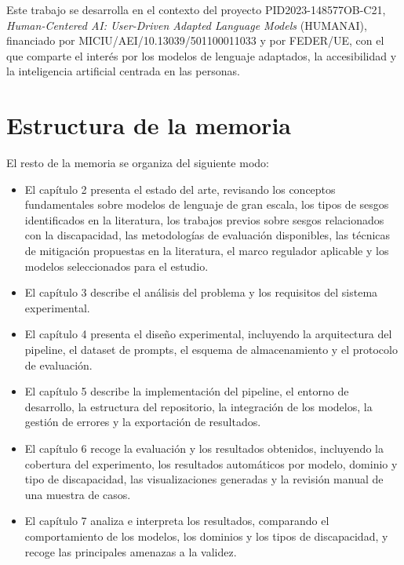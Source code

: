 \documentclass[12pt]{report} %
\renewcommand{\_}{\oldunderscore\allowbreak}
\begin{document}
Este trabajo se desarrolla en el contexto del proyecto PID2023-148577OB-C21, \textit{Human-Centered AI: User-Driven Adapted Language Models} (HUMAN\_AI), financiado por MICIU/AEI/10.13039/501100011033 y por FEDER/UE, con el que comparte el interés por los modelos de lenguaje adaptados, la accesibilidad y la inteligencia artificial centrada en las personas.

\section{Estructura de la memoria}

El resto de la memoria se organiza del siguiente modo:

\begin{itemize}
    \item El capítulo 2 presenta el estado del arte, revisando los conceptos fundamentales sobre modelos de lenguaje de gran escala, los tipos de sesgos identificados en la literatura, los trabajos previos sobre sesgos relacionados con la discapacidad, las metodologías de evaluación disponibles, las técnicas de mitigación propuestas en la literatura, el marco regulador aplicable y los modelos seleccionados para el estudio.

    \item El capítulo 3 describe el análisis del problema y los requisitos del sistema experimental.

    \item El capítulo 4 presenta el diseño experimental, incluyendo la arquitectura del pipeline, el dataset de prompts, el esquema de almacenamiento y el protocolo de evaluación.

    \item El capítulo 5 describe la implementación del pipeline, el entorno de desarrollo, la estructura del repositorio, la integración de los modelos, la gestión de errores y la exportación de resultados.

    \item El capítulo 6 recoge la evaluación y los resultados obtenidos, incluyendo la cobertura del experimento, los resultados automáticos por modelo, dominio y tipo de discapacidad, las visualizaciones generadas y la revisión manual de una muestra de casos.

    \item El capítulo 7 analiza e interpreta los resultados, comparando el comportamiento de los modelos, los dominios y los tipos de discapacidad, y recoge las principales amenazas a la validez.


\end{itemize}
\end{document}
